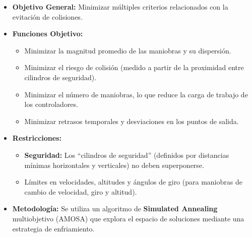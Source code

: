 \begin{frame}{\parencite{mateos_multiobjective_2016} }{}
    \begin{itemize}
        \item \textbf{Objetivo General:}
              Minimizar múltiples criterios relacionados con la evitación de colisiones.
        \item \textbf{Funciones Objetivo:}
              \begin{itemize}
                  \item Minimizar la magnitud promedio de las maniobras y su dispersión.
                  \item Minimizar el riesgo de colisión (medido a partir de la proximidad entre cilindros de seguridad).
                  \item Minimizar el número de maniobras, lo que reduce la carga de trabajo de los controladores.
                  \item Minimizar retrasos temporales y desviaciones en los puntos de salida.
              \end{itemize}
        \item \textbf{Restricciones:}
              \begin{itemize}
                  \item \textbf{Seguridad:} Los “cilindros de seguridad” (definidos por distancias mínimas horizontales y verticales) no deben superponerse.
                  \item Límites en velocidades, altitudes y ángulos de giro (para maniobras de cambio de velocidad, giro y altitud).
              \end{itemize}
        \item \textbf{Metodología:}
              Se utiliza un algoritmo de \textbf{Simulated Annealing} multiobjetivo (AMOSA) que explora el espacio de soluciones mediante una estrategia de enfriamiento.
    \end{itemize}
\end{frame}

